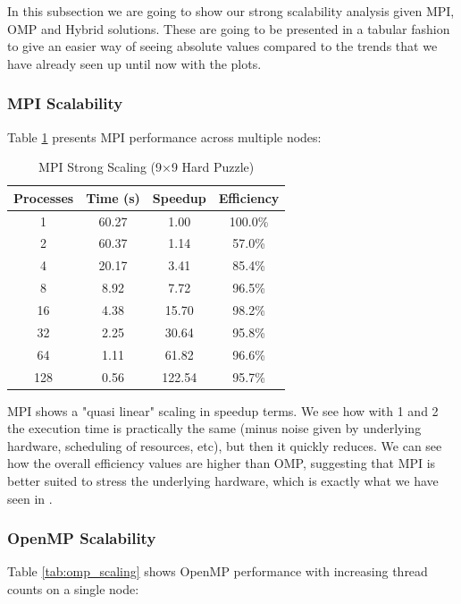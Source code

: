 In this subsection we are going to show our strong scalability analysis given MPI, OMP and Hybrid solutions. These are going to be presented in a tabular fashion to give an easier way of seeing absolute values compared to the trends that we have already seen up until now with the plots.

\subsubsection{MPI Scalability}
\label{subsubsec:mpi_scalability}
Table \ref{tab:mpi_scaling} presents MPI performance across multiple nodes:

\begin{table}[htbp]
\caption{MPI Strong Scaling (9×9 Hard Puzzle)}
\begin{center}
\begin{tabular}{@{}cccc@{}}
\toprule
\textbf{Processes} & \textbf{Time (s)} & \textbf{Speedup} & \textbf{Efficiency} \\
\midrule
1   & 60.27 & 1.00   & 100.0\% \\
2   & 60.37 & 1.14   & 57.0\% \\
4   & 20.17 & 3.41   & 85.4\% \\
8   & 8.92  & 7.72   & 96.5\% \\
16  & 4.38  & 15.70  & 98.2\% \\
32  & 2.25  & 30.64  & 95.8\% \\
64  & 1.11  & 61.82  & 96.6\% \\
128 & 0.56  & 122.54 & 95.7\% \\
\bottomrule
\end{tabular}
\end{center}
\label{tab:mpi_scaling}
\end{table}


MPI shows a "quasi linear" scaling in speedup terms. We see how with 1 and 2 the execution time is practically the same (minus noise given by underlying hardware, scheduling of resources, etc), but then it quickly reduces. We can see how the overall efficiency values are higher than OMP, suggesting that MPI is better suited to stress the underlying hardware, which is exactly what we have seen in .

\subsubsection{OpenMP Scalability}
\label{subsubsec:omp_scalability}
Table \ref{tab:omp_scaling} shows OpenMP performance with increasing thread counts on a single node:


